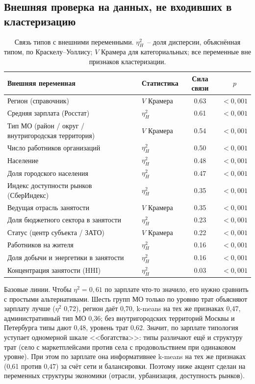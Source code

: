 \documentclass[11pt,a4paper]{article}
\begin{document}
\subsection{Внешняя проверка на данных, не входивших в кластеризацию}\label{sec:external}

\begin{table}[htbp]
\centering\small
\caption{Связь типов с внешними переменными. $\eta^2_H$~-- доля дисперсии, объяснённая типом, по Краскелу--Уоллису; $V$ Крамера для категориальных; все переменные вне признаков кластеризации.}
\label{tab:external}
\begin{tabularx}{\textwidth}{Ylcc}
\toprule
Внешняя переменная & Статистика & Сила связи & $p$ \\
\midrule
Регион (справочник) & $V$ Крамера & 0.63 & $<0{,}001$ \\
Средняя зарплата (Росстат) & $\eta^2_H$ & 0.61 & $<0{,}001$ \\
Тип МО (район / округ / внутригородская территория) & $V$ Крамера & 0.54 & $<0{,}001$ \\
Число работников организаций & $\eta^2_H$ & 0.50 & $<0{,}001$ \\
Население & $\eta^2_H$ & 0.48 & $<0{,}001$ \\
Доля городского населения & $\eta^2_H$ & 0.47 & $<0{,}001$ \\
Индекс доступности рынков (СберИндекс) & $\eta^2_H$ & 0.35 & $<0{,}001$ \\
Ведущая отрасль занятости & $V$ Крамера & 0.35 & $<0{,}001$ \\
Доля бюджетного сектора в занятости & $\eta^2_H$ & 0.23 & $<0{,}001$ \\
Статус (центр субъекта / ЗАТО) & $V$ Крамера & 0.22 & $<0{,}001$ \\
Работников на жителя & $\eta^2_H$ & 0.16 & $<0{,}001$ \\
Доля добычи и энергетики в занятости & $\eta^2_H$ & 0.16 & $<0{,}001$ \\
Концентрация занятости (HHI) & $\eta^2_H$ & 0.03 & $<0{,}001$ \\
\bottomrule
\end{tabularx}
\end{table}

Базовые линии. Чтобы $\eta^2=0{,}61$ по зарплате что-то значило, его нужно сравнить с простыми альтернативами. Шесть групп МО только по уровню трат объясняют зарплату лучше ($\eta^2$ 0,72), регион даёт 0,70, k-means на тех же признаках 0,47, административный тип МО 0,36; без внутригородских территорий Москвы и Петербурга типы дают 0,48, уровень трат 0,62. Значит, по зарплате типология уступает одномерной шкале <<богатства>>: типы различают ещё и структуру трат (село с маркетплейсами против села с продовольствием при одинаковом уровне). При этом по зарплате она информативнее k-means на тех же признаках (0,61 против 0,47) за счёт сети и балансировки. Поэтому ниже акцент сделан на переменных структуры экономики (отрасли, урбанизация, доступность рынков).
\end{document}
